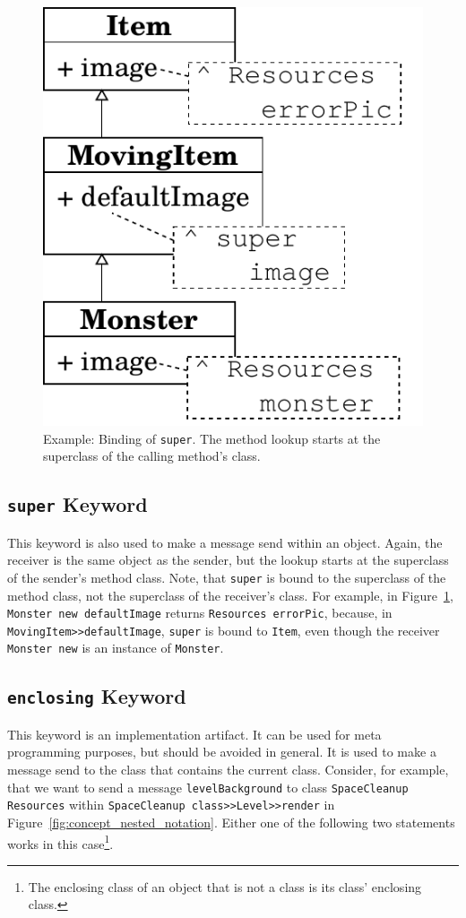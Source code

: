 \begin{figure}
	\includegraphics[scale=0.75]{super_binding.pdf}
	\centering
	\caption[Example: Binding of \texttt{super}]{Example: Binding of \texttt{super}. The method lookup starts at the superclass of the calling method's class.}
	\label{fig:concept_super_binding}
\end{figure}

\subsection{\texttt{super} Keyword}
This keyword is also used to make a message send within an object. Again, the receiver is the same object as the sender, but the lookup starts at the superclass of the sender's method class. Note, that \texttt{super} is bound to the superclass of the method class, not the superclass of the receiver's class. For example, in Figure~\ref{fig:concept_super_binding}, \texttt{Monster new defaultImage} returns \texttt{Resources errorPic}, because, in \texttt{MovingItem>>defaultImage}, \texttt{super} is bound to \texttt{Item}, even though the receiver \texttt{Monster new} is an instance of \texttt{Monster}.

\subsection{\texttt{enclosing} Keyword}
This keyword is an implementation artifact. It can be used for meta programming purposes, but should be avoided in general. It is used to make a message send to the class that contains the current class. Consider, for example, that we want to send a message \texttt{levelBackground} to class \texttt{SpaceCleanup Resources} within \texttt{SpaceCleanup class>>Level>>render} in Figure~\ref{fig:concept_nested_notation}. Either one of the following two statements works in this case\footnote{The enclosing class of an object that is not a class is its class' enclosing class.}.

